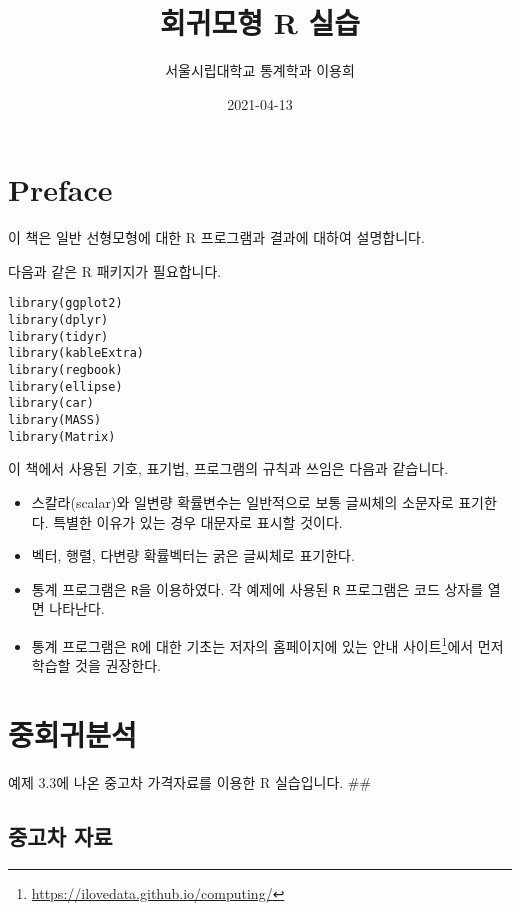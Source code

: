 \documentclass[
]{book}
\title{회귀모형 R 실습}
\author{서울시립대학교 통계학과 이용희}
\date{2021-04-13}
\makeatletter
\providecommand{\tightlist}{%
  \setlength{\itemsep}{0pt}\setlength{\parskip}{0pt}}
\renewcommand{\href}[2]{#2\footnote{\url{#1}}}
\newenvironment{kframe}{%
\medskip{}
\setlength{\fboxsep}{.8em}
 \def\at@end@of@kframe{}%
 \ifinner\ifhmode%
  \def\at@end@of@kframe{\end{minipage}}%
  \begin{minipage}{\columnwidth}%
 \fi\fi%
 \def\FrameCommand##1{\hskip\@totalleftmargin \hskip-\fboxsep
 \colorbox{shadecolor}{##1}\hskip-\fboxsep
     \hskip-\linewidth \hskip-\@totalleftmargin \hskip\columnwidth}%
 \MakeFramed {\advance\hsize-\width
   \@totalleftmargin\z@ \linewidth\hsize
   \@setminipage}}%
 {\par\unskip\endMakeFramed%
 \at@end@of@kframe}
\newenvironment{rmdblock}[1]
  {
  \begin{itemize}
  \renewcommand{\labelitemi}{
    \raisebox{-.7\height}[0pt][0pt]{
      {\setkeys{Gin}{width=3em,keepaspectratio}\texttt{[image: images/\#1]}}
    }
  }
  \setlength{\fboxsep}{1em}
  \begin{kframe}
  \item
  }
  {
  \end{kframe}
  \end{itemize}
  }
\newenvironment{rmdimportant}
  {\begin{rmdblock}{important}}
  {\end{rmdblock}}
\makeatother
\begin{document}
\maketitle

{
\setcounter{tocdepth}{1}
\tableofcontents
}
\hypertarget{preface}{%
\chapter*{Preface}\label{preface}}


이 책은 일반 선형모형에 대한 R 프로그램과 결과에 대하여 설명합니다.

다음과 같은 R 패키지가 필요합니다.

\begin{verbatim}
library(ggplot2)
library(dplyr)
library(tidyr)
library(kableExtra)
library(regbook)
library(ellipse)
library(car)
library(MASS)
library(Matrix)
\end{verbatim}

\begin{rmdimportant}
이 책에서 사용된 기호, 표기법, 프로그램의 규칙과 쓰임은 다음과 같습니다.

\begin{itemize}
\tightlist
\item
  스칼라(scalar)와 일변량 확률변수는 일반적으로 보통 글씨체의 소문자로 표기한다. 특별한 이유가 있는 경우 대문자로 표시할 것이다.
\item
  벡터, 행렬, 다변량 확률벡터는 굵은 글씨체로 표기한다.
\item
  통계 프로그램은 \texttt{R}을 이용하였다. 각 예제에 사용된 \texttt{R} 프로그램은 코드 상자를 열면 나타난다.
\item
  통계 프로그램은 \texttt{R}에 대한 기초는 저자의 홈페이지에 있는 \href{https://ilovedata.github.io/computing/}{안내 사이트}에서 먼저 학습할 것을 권장한다.
\end{itemize}
\end{rmdimportant}

\mainmatter

\hypertarget{chapter03}{%
\chapter{중회귀분석}\label{chapter03}}

예제 3.3에 나온 중고차 가격자료를 이용한 R 실습입니다.
\#\#

\hypertarget{uxc911uxace0uxcc28-uxc790uxb8cc}{%
\section{중고차 자료}\label{uxc911uxace0uxcc28-uxc790uxb8cc}}
\end{document}

